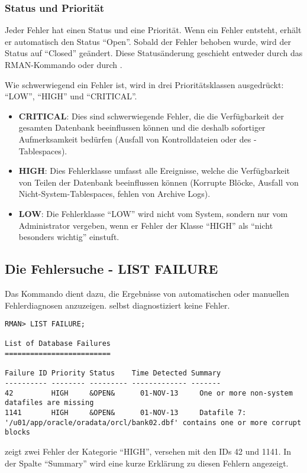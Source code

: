         \subsubsection{Status und Priorit\"at}
          Jeder Fehler hat einen Status und eine Priorit\"at. Wenn ein Fehler entsteht, erh\"alt er automatisch den Status \enquote{Open}. Sobald der Fehler behoben wurde, wird der Status auf \enquote{Closed} ge\"andert. Diese Status\"anderung geschieht entweder durch das RMAN-Kommando  oder durch .

          Wie schwerwiegend ein Fehler ist, wird in drei Priorit\"atsklassen ausgedr\"uckt: \enquote{LOW}, \enquote{HIGH} und \enquote{CRITICAL}.
          \begin{itemize}
            \item \textbf{CRITICAL}: Dies sind schwerwiegende Fehler, die die Verf\"ugbarkeit der gesamten Datenbank beeinflussen k\"onnen und die deshalb sofortiger Aufmerksamkeit bed\"urfen (Ausfall von Kontrolldateien oder des -Tablespaces).
            \item \textbf{HIGH}: Dies Fehlerklasse umfasst alle Ereignisse, welche die Verf\"ugbarkeit von Teilen der Datenbank beeinflussen k\"onnen (Korrupte Bl\"ocke, Ausfall von Nicht-System-Tablespaces, fehlen von Archive Logs).
            \item \textbf{LOW}: Die Fehlerklasse \enquote{LOW} wird nicht vom System, sondern nur vom Administrator vergeben, wenn er Fehler der Klasse \enquote{HIGH} als \enquote{nicht besonders wichtig} einstuft.
          \end{itemize}
      \subsection{Die Fehlersuche - LIST FAILURE}
        Das Kommando  dient dazu, die Ergebnisse von automatischen oder manuellen Fehlerdiagnosen anzuzeigen.  selbst diagnostiziert keine Fehler.
        \begin{lstlisting}[caption={Das Kommando \languagerman{LIST FAILURE}},label=admin1538,language=rman]
RMAN> LIST FAILURE;

List of Database Failures
=========================

Failure ID Priority Status    Time Detected Summary
---------- -------- --------- ------------- -------
42         HIGH     &OPEN&      01-NOV-13     One or more non-system
datafiles are missing
1141       HIGH     &OPEN&      01-NOV-13     Datafile 7:
'/u01/app/oracle/oradata/orcl/bank02.dbf' contains one or more corrupt blocks
        \end{lstlisting}
         zeigt zwei Fehler der Kategorie \enquote{HIGH}, versehen mit den IDs 42 und 1141. In der Spalte \enquote{Summary} wird eine kurze Erkl\"arung zu diesen Fehlern angezeigt.
